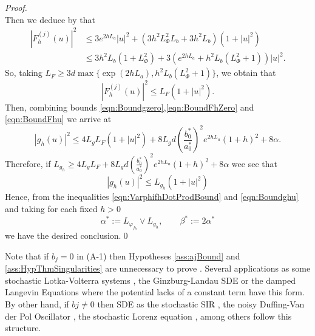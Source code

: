 \begin{proof}
\begin{dmath*}
	\end{dmath*}
	Then we deduce by  that
	\begin{align*}
		|F_h^{(j)}(u)|^2 
		&\leq
			3 e^{2h L_a }|u|^2 + (3 h^2 L_{\Phi}^2 L_b + 3h^ 2L_b) (1+|u|^2) \\
		&\leq
			3 h^2 L_b (1 + L_{\Phi}^2)   +
			3 \left(
				 e^{2 h L_a} + h^2 L_b (L_{\Phi}^2 + 1 ) 
			\right)|u|^2.	
	\end{align*}
	So, taking 
	$
		L_F\geq 3 d \max\{ \exp(2h L_a),  h^2 L_b(L_{\Phi}^2+1)\}
	$,
	we obtain that
	\begin{equation}\label{eqn:BoundFhu}
		|F_h^{(j)}(u)|^2
		\leq
			L_F(1+|u|^2).	
	\end{equation}
	Then, combining bounds \eqref{eqn:Boundgzero},\eqref{eqn:BoundFhZero} and \eqref{eqn:BoundFhu} we arrive at
	\begin{equation*}
		|g_h(u)|^2 \leq
			4 L_g L_F(1+|u|^2)
			+ 8 L_g d
			\left(
				\frac{b_0^*}{a_0^*}
			\right)^2
			e^{2h L_a} (1+h)^2
			+8 \alpha.
	\end{equation*}
	Therefore, if
	$
		 L_{g_h} 
		 \geq 
			  4 L_g L_F + 8 L_g d
			  \left(
				  \frac{b_0^*}{a_0^*}
			  \right)^2
			  e^{2h L_a} (1+h)^2
			  +8 \alpha		  
	$
	wee see that
	\begin{equation}\label{eqn:Boundghu}
		|g_h(u)|^2
		\leq
			L_{g_h}(1+|u|^2)		
	\end{equation}
	Hence, from the inequalities \eqref{eqn:VarphifhDotProdBound} and \eqref{eqn:Boundghu} and taking
	for each fixed $h>0$
	$$
		\alpha^* := L_{\varphi_{f_h}}\vee L_{g_h}, \qquad
		\beta^* := 2\alpha^*
	$$ 
	 we have the desired conclusion.\qed
\end{proof}
%
\begin{remark}\label{rmk:PertrubedSDE}
	Note that if $b_j=0$ in (A-1) 
	then Hypotheses \ref{ass:ajBound} and \ref{ass:HypThmSingularities} are unnecessary to 
	prove . Several  applications  as some stochastic
	Lotka-Volterra systems \cite{Mao2002,Mao2003},  
	the Ginzburg-Landau SDE \cite{Kloeden1992} or
	the damped Langevin Equations where the potential lacks of a constant term 
	\cite{Hutzenthaler2012a} have this form. 
	By other hand, if $bj\neq 0$ then SDE as 
	the stochastic SIR \cite{Tornatore2005},
	the noisy Duffing-Van der Pol Oscillator \cite{Schenk-Hoppe1996b}, the stochastic Lorenz equation
	\cite{Gao2002}, among others follow this structure.
\end{remark}
